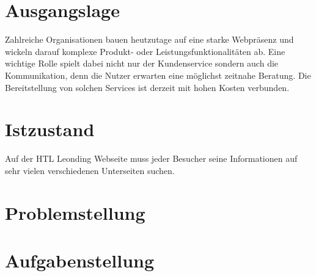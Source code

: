 \section{Ausgangslage}
Zahlreiche Organisationen bauen heutzutage auf eine starke Webpräsenz und wickeln darauf komplexe Produkt- oder Leistungsfunktionalitäten ab. Eine wichtige Rolle spielt dabei nicht nur der Kundenservice sondern auch die Kommunikation, denn die Nutzer erwarten eine möglichst zeitnahe Beratung. Die Bereitstellung von solchen Services ist derzeit mit hohen Kosten verbunden.

\section{Istzustand}
Auf der HTL Leonding Webseite muss jeder Besucher seine Informationen auf sehr vielen verschiedenen Unterseiten suchen.


\section{Problemstellung}


\section{Aufgabenstellung}

